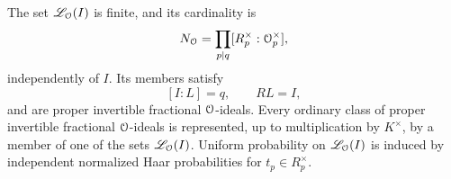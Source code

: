 \begin{lemma}\label{lem:pkt-local-labels}
The set \(\mathscr L_{\mathcal O}(I)\) is finite, and its cardinality is
\begin{equation}\label{eq:pkt-label-count}
 N_{\mathcal O}=\prod_{p\mid q}[R_p^\times:\mathcal O_p^\times],
\end{equation}
independently of \(I\).  Its members satisfy
\[
 [I:L]=q,\qquad RL=I,
\]
and are proper invertible fractional \(\mathcal O\)-ideals.  Every ordinary
class of proper invertible fractional \(\mathcal O\)-ideals is represented,
up to multiplication by \(K^\times\), by a member of one of the sets
\(\mathscr L_{\mathcal O}(I)\).  Uniform probability on
\(\mathscr L_{\mathcal O}(I)\) is induced by independent normalized Haar
probabilities for \(t_p\in R_p^\times\).
\end{lemma}

